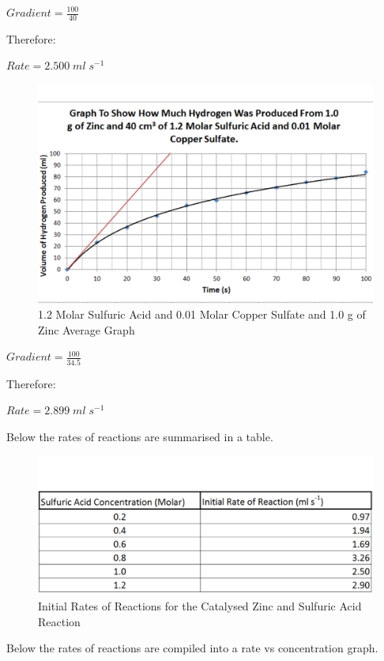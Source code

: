 $Gradient = \frac{100}{40}$

Therefore:

$Rate = 2.500 \; ml \; s^{-1}$

\begin{figure}[H]
    \includegraphics[width=\textwidth]{./Analysis/Images/2Catalysed/12Molar.pdf}
    \caption{1.2 Molar Sulfuric Acid and 0.01 Molar Copper Sulfate and 1.0 g of Zinc Average Graph} \label{fig:12MolarSACSGradient}
\end{figure}

$Gradient = \frac{100}{34.5}$

Therefore:

$Rate = 2.899 \; ml \; s^{-1}$

Below the rates of reactions are summarised in a table.

\begin{figure}[H]
    \includegraphics[width=\textwidth]{./Analysis/Images/2Catalysed/Rates.pdf}
    \caption{Initial Rates of Reactions for the Catalysed Zinc and Sulfuric Acid Reaction} \label{fig:RatesSACS}
\end{figure}

Below the rates of reactions are compiled into a rate vs concentration graph.

